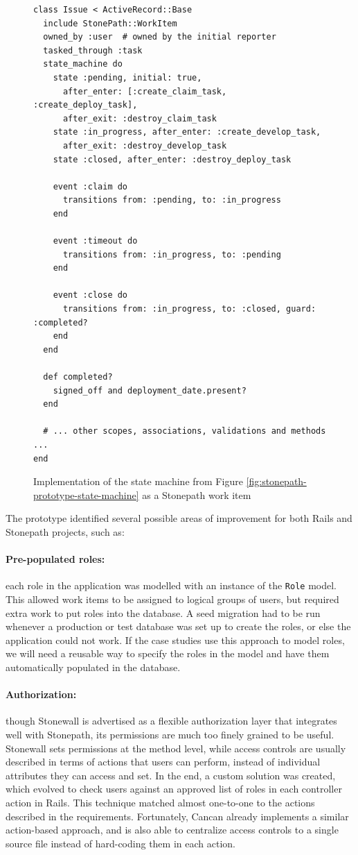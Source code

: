 \documentclass[document.tex]{subfiles}
\begin{document}
\begin{figure}[!ht]
  \begin{lstlisting}
class Issue < ActiveRecord::Base
  include StonePath::WorkItem
  owned_by :user  # owned by the initial reporter
  tasked_through :task
  state_machine do
    state :pending, initial: true,
      after_enter: [:create_claim_task, :create_deploy_task],
      after_exit: :destroy_claim_task
    state :in_progress, after_enter: :create_develop_task,
      after_exit: :destroy_develop_task
    state :closed, after_enter: :destroy_deploy_task

    event :claim do
      transitions from: :pending, to: :in_progress
    end

    event :timeout do
      transitions from: :in_progress, to: :pending
    end

    event :close do
      transitions from: :in_progress, to: :closed, guard: :completed?
    end
  end

  def completed?
    signed_off and deployment_date.present?
  end

  # ... other scopes, associations, validations and methods ...
end
  \end{lstlisting}
  \caption{Implementation of the state machine from Figure \ref{fig:stonepath-prototype-state-machine} as a Stonepath work item}
  \label{fig:stonepath-prototype-workitem}
\end{figure}

The prototype identified several possible areas of improvement for both Rails and Stonepath projects, such as:

\paragraph{Pre-populated roles:} each role in the application was modelled with an instance of the \verb!Role! model. This allowed work items to be assigned to logical groups of users, but required extra work to put roles into the database. A seed migration had to be run whenever a production or test database was set up to create the roles, or else the application could not work. If the case studies use this approach to model roles, we will need a reusable way to specify the roles in the model and have them automatically populated in the database.

\paragraph{Authorization:} though Stonewall is advertised as a flexible authorization layer that integrates well with Stonepath, its permissions are much too finely grained to be useful. Stonewall sets permissions at the method level, while access controls are usually described in terms of actions that users can perform, instead of individual attributes they can access and set. In the end, a custom solution was created, which evolved to check users against an approved list of roles in each controller action in Rails. This technique matched almost one-to-one to the actions described in the requirements. Fortunately, Cancan already implements a similar action-based approach, and is also able to centralize access controls to a single source file instead of hard-coding them in each action.
\end{document}
